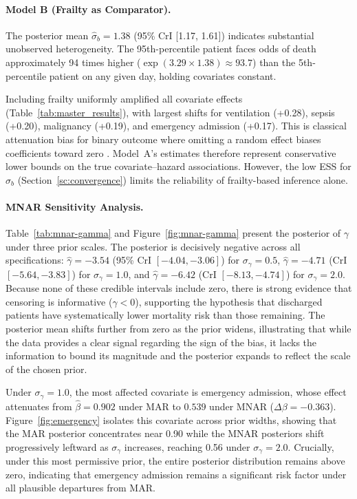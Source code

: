 \documentclass[twoside,11pt]{article}
\begin{document}
 
\paragraph{Model B (Frailty as Comparator).}
The posterior mean $\hat{\sigma}_b = 1.38$ (95\% CrI [1.17, 1.61]) indicates substantial unobserved heterogeneity. The 95th-percentile patient faces odds of death approximately 94 times higher ($\exp(3.29 \times 1.38) \approx 93.7$) than the 5th-percentile patient on any given day, holding covariates constant.
 
Including frailty uniformly amplified all covariate effects (Table~\ref{tab:master_results}), with largest shifts for ventilation (+0.28), sepsis (+0.20), malignancy (+0.19), and emergency admission (+0.17). This is classical attenuation bias for binary outcome where omitting a random effect biases coefficients toward zero \citep{daniels2008}. Model~A's estimates therefore represent conservative lower bounds on the true covariate--hazard associations. However, the low ESS for $\sigma_b$ (Section~\ref{sc:convergence}) limits the reliability of frailty-based inference alone.
 
% 
% 
 
 
\paragraph{MNAR Sensitivity Analysis.}\label{sec:mnar-results}
Table~\ref{tab:mnar-gamma} and Figure~\ref{fig:mnar-gamma} present the posterior of $\gamma$ under three prior scales. The posterior is decisively negative across all specifications:
$\hat{\gamma} = -3.54$ (95\% CrI $[-4.04, -3.06]$) for $\sigma_\gamma = 0.5$,
$\hat{\gamma} = -4.71$ (CrI $[-5.64, -3.83]$) for $\sigma_\gamma = 1.0$, and
$\hat{\gamma} = -6.42$ (CrI $[-8.13, -4.74]$) for $\sigma_\gamma = 2.0$.
Because none of these credible intervals include zero, there is strong evidence that censoring is informative ($\gamma < 0$), supporting the hypothesis that discharged patients have systematically lower mortality risk than those remaining. The posterior mean shifts further from zero as the prior widens, illustrating that while the data provides a clear signal regarding the sign of the bias, it lacks the information to bound its magnitude and the posterior expands to reflect the scale of the chosen prior.
 
Under $\sigma_\gamma = 1.0$, the most affected covariate is emergency admission, whose effect attenuates from $\hat\beta = 0.902$ under MAR to $0.539$ under MNAR ($\Delta \beta = -0.363$). Figure~\ref{fig:emergency} isolates this covariate across prior widths, showing that the MAR posterior concentrates near 0.90 while the MNAR posteriors shift progressively leftward as $\sigma_\gamma$ increases, reaching 0.56 under $\sigma_\gamma = 2.0$. Crucially, under this most permissive prior, the entire posterior distribution remains above zero, indicating that emergency admission remains a significant risk factor under all plausible departures from MAR.
 
\end{document}
